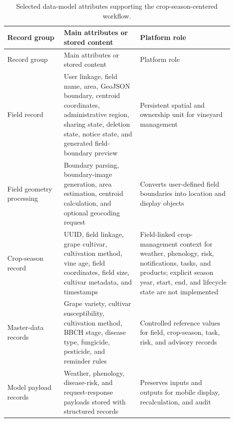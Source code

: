 \documentclass[12pt]{article}
\begin{document}
\begingroup
\setlength{\tabcolsep}{3pt}
\renewcommand{\arraystretch}{1.12}
\begin{longtable}{@{}L{0.23\linewidth} L{0.31\linewidth} L{0.38\linewidth}@{}}
\caption{Selected data-model attributes supporting the crop-season-centered workflow.}\label{tab:supp_data_model_attributes}\\
\toprule
Record group & Main attributes or stored content & Platform role \\
\midrule
\endfirsthead
\toprule
Record group & Main attributes or stored content & Platform role \\
\midrule
\endhead
Field record & User linkage, field name, area, GeoJSON boundary, centroid coordinates, administrative region, sharing state, deletion state, notice state, and generated field-boundary preview & Persistent spatial and ownership unit for vineyard management \\
Field geometry processing & Boundary parsing, boundary-image generation, area estimation, centroid calculation, and optional geocoding request & Converts user-defined field boundaries into location and display objects \\
Crop-season record & UUID, field linkage, grape cultivar, cultivation method, vine age, field coordinates, field size, cultivar metadata, and timestamps & Field-linked crop-management context for weather, phenology, risk, notifications, tasks, and products; explicit season year, start, end, and lifecycle state are not implemented \\
Master-data records & Grape variety, cultivar susceptibility, cultivation method, BBCH stage, disease type, fungicide, pesticide, and reminder rules & Controlled reference values for field, crop-season, task, risk, and advisory records \\
Model payload records & Weather, phenology, disease-risk, and request-response payloads stored with structured records & Preserves inputs and outputs for mobile display, recalculation, and audit \\
\bottomrule
\end{longtable}
\endgroup
\end{document}
